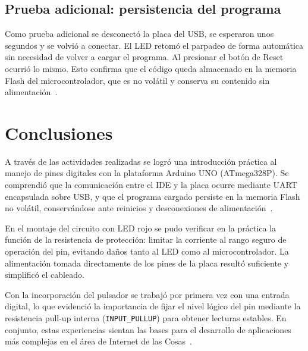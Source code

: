 \subsection{Prueba adicional: persistencia del programa}
Como prueba adicional se desconectó la placa del USB, se esperaron unos segundos
y se volvió a conectar. El LED retomó el parpadeo de forma automática sin
necesidad de volver a cargar el programa. Al presionar el botón de Reset ocurrió
lo mismo. Esto confirma que el código queda almacenado en la memoria Flash del
microcontrolador, que es no volátil y conserva su contenido sin
alimentación~\cite{atmega328,guialab}.

\section{Conclusiones}
A través de las actividades realizadas se logró una introducción práctica al manejo
de pines digitales con la plataforma Arduino UNO (ATmega328P). Se comprendió que la
comunicación entre el IDE y la placa ocurre mediante UART encapsulada sobre USB, y que
el programa cargado persiste en la memoria Flash no volátil, conservándose ante reinicios
y desconexiones de alimentación~\cite{unoboard,atmega328,arduinoref}.

En el montaje del circuito con LED rojo se pudo verificar en la práctica la función de
la resistencia de protección: limitar la corriente al rango seguro de operación del pin,
evitando da\~nos tanto al LED como al microcontrolador. La alimentación tomada directamente
de los pines de la placa resultó suficiente y simplificó el cableado.

Con la incorporación del pulsador se trabajó por primera vez con una entrada digital,
lo que evidenció la importancia de fijar el nivel lógico del pin mediante la resistencia
pull-up interna (\texttt{INPUT\_PULLUP}) para obtener lecturas estables. En conjunto,
estas experiencias sientan las bases para el desarrollo de aplicaciones más complejas
en el área de Internet de las Cosas~\cite{guialab,arduinoref}.

